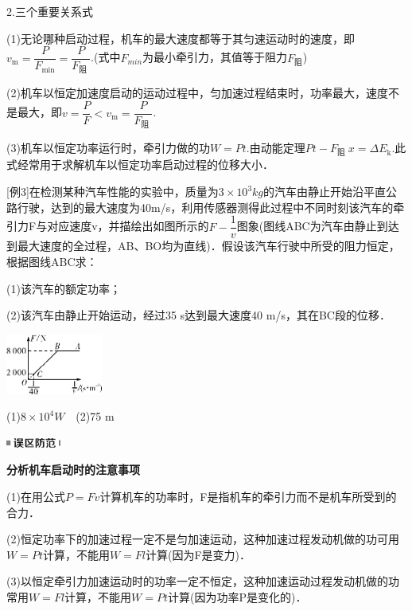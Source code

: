 \documentclass[cn,10.5pt,chinese,mac,chinesefont=founder]{elegantbook}
\begin{document}
2.三个重要关系式

(1)无论哪种启动过程，机车的最大速度都等于其匀速运动时的速度，即$v_{\mathrm{m}}=\dfrac{P}{F_{\min }}=\dfrac{P}{F_{\text {阻 }}}$.(式中$F_{min}$为最小牵引力，其值等于阻力$F_{\text{阻}}$)

(2)机车以恒定加速度启动的运动过程中，匀加速过程结束时，功率最大，速度不是最大，即$v=\dfrac{P}{F}<v_{\mathrm{m}}=\dfrac{P}{F_{\text {阻 }}}$.

(3)机车以恒定功率运行时，牵引力做的功$W=Pt$.由动能定理$P t-F_{\text {阻 }}x=\Delta E_{\mathrm{k}}$.此式经常用于求解机车以恒定功率启动过程的位移大小．

{[}例3{]}在检测某种汽车性能的实验中，质量为$3\times 10^3kg$的汽车由静止开始沿平直公路行驶，达到的最大速度为40m/s，利用传感器测得此过程中不同时刻该汽车的牵引力F与对应速度v，并描绘出如图所示的$F-\dfrac{1}{v}$图象(图线ABC为汽车由静止到达到最大速度的全过程，AB、BO均为直线)．假设该汽车行驶中所受的阻力恒定，根据图线ABC求：

(1)该汽车的额定功率；

(2)该汽车由静止开始运动，经过35 s达到最大速度40 m/s，其在BC段的位移．

\begin{center}\includegraphics[width=1.25in,height=0.78125in]{media/image212.png}\end{center}

\begin{solution}
	(1)$8\times 10^4 W$　(2)75 m
\end{solution}
\begin{center}\includegraphics[width=0.70833in,height=0.125in]{media/image34.png}

\textbf{分析机车启动时的注意事项}
\end{center}


(1)在用公式$P=Fv$计算机车的功率时，F是指机车的牵引力而不是机车所受到的合力．

(2)恒定功率下的加速过程一定不是匀加速运动，这种加速过程发动机做的功可用$W=Pt$计算，不能用$W=Fl$计算(因为F是变力)．

(3)以恒定牵引力加速运动时的功率一定不恒定，这种加速运动过程发动机做的功常用$W=Fl$计算，不能用$W=Pt$计算(因为功率P是变化的)．
\end{document}
